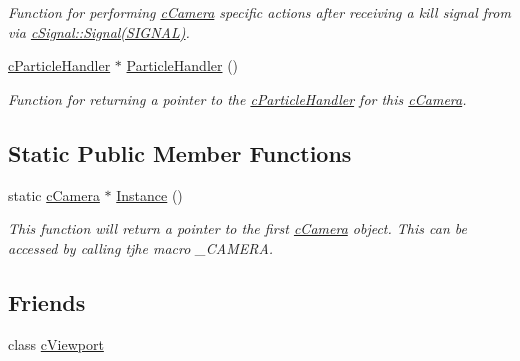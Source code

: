\begin{DoxyCompactItemize}
\begin{DoxyCompactList}\small\item\em Function for performing \hyperlink{classc_camera}{cCamera} specific actions after receiving a kill signal from via \hyperlink{classc_signal_a545074be1da41d00050bed3cd2fb2305}{cSignal::Signal(SIGNAL)}. \end{DoxyCompactList}\item 
\hypertarget{classc_camera_ab798297d6aa91192e45f7910da1e0f9b}{
\hyperlink{classc_particle_handler}{cParticleHandler} $\ast$ \hyperlink{classc_camera_ab798297d6aa91192e45f7910da1e0f9b}{ParticleHandler} ()}
\label{classc_camera_ab798297d6aa91192e45f7910da1e0f9b}

\begin{DoxyCompactList}\small\item\em Function for returning a pointer to the \hyperlink{classc_particle_handler}{cParticleHandler} for this \hyperlink{classc_camera}{cCamera}. \end{DoxyCompactList}\end{DoxyCompactItemize}
\subsection*{Static Public Member Functions}
\begin{DoxyCompactItemize}
\item 
\hypertarget{classc_camera_a06efab78c09ce37c375837242719bf58}{
static \hyperlink{classc_camera}{cCamera} $\ast$ \hyperlink{classc_camera_a06efab78c09ce37c375837242719bf58}{Instance} ()}
\label{classc_camera_a06efab78c09ce37c375837242719bf58}

\begin{DoxyCompactList}\small\item\em This function will return a pointer to the first \hyperlink{classc_camera}{cCamera} object. This can be accessed by calling tjhe macro \_\-CAMERA. \end{DoxyCompactList}\end{DoxyCompactItemize}
\subsection*{Friends}
\begin{DoxyCompactItemize}
\item 
\hypertarget{classc_camera_a36b5bd53c16eecf39974e65e00bd408e}{
class \hyperlink{classc_camera_a36b5bd53c16eecf39974e65e00bd408e}{cViewport}}
\label{classc_camera_a36b5bd53c16eecf39974e65e00bd408e}

\end{DoxyCompactItemize}



